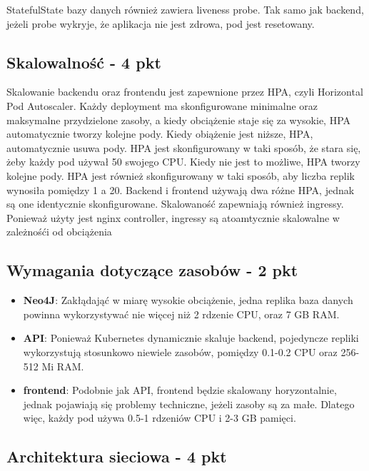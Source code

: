 \documentclass[12pt,a4paper]{article}
\begin{document}
StatefulState bazy danych również zawiera liveness probe. Tak samo jak backend, jeżeli probe wykryje, że aplikacja nie jest zdrowa, pod jest resetowany.


\subsection{Skalowalność - 4 pkt}
\label{sec:ExamplesSection}

Skalowanie backendu oraz frontendu jest zapewnione przez HPA, czyli Horizontal Pod Autoscaler. Każdy deployment ma skonfigurowane minimalne oraz maksymalne przydzielone zasoby, a kiedy obciążenie staje się za wysokie, HPA automatycznie tworzy kolejne pody. Kiedy obiążenie jest niższe, HPA, automatycznie usuwa pody.
HPA jest skonfigurowany w taki sposób, że stara się, żeby każdy pod używał 50 swojego CPU. Kiedy nie jest to możliwe, HPA tworzy kolejne pody. HPA jest również skonfigurowany w taki sposób, aby liczba replik wynosiła pomiędzy 1 a 20.
Backend i frontend używają dwa różne HPA, jednak są one identycznie skonfigurowane.
Skalowaność zapewniają również ingressy. Ponieważ użyty jest nginx controller, ingressy są atoamtycznie skalowalne w zależnośći od obciążenia

\subsection{Wymagania dotyczące zasobów - 2 pkt}
\label{sec:ExampleTables}

\begin{itemize}
    \item \textbf{Neo4J}: Zakłądająć w miarę wysokie obciążenie, jedna replika baza danych powinna wykorzystywać nie więcej niż 2 rdzenie CPU, oraz 7 GB RAM.
    \item \textbf{API}: Ponieważ Kubernetes dynamicznie skaluje backend, pojedyncze repliki wykorzystują stosunkowo niewiele zasobów, pomiędzy 0.1-0.2 CPU oraz 256-512 Mi RAM.
    \item \textbf{frontend}: Podobnie jak API, frontend będzie skalowany horyzontalnie, jednak pojawiają się problemy techniczne, jeżeli zasoby są za małe. Dlatego więc, każdy pod używa 0.5-1 rdzeniów CPU i 2-3 GB pamięci.
\end{itemize}


\subsection{Architektura sieciowa - 4 pkt}
\label{sec:ExampleResults}
\end{document}
